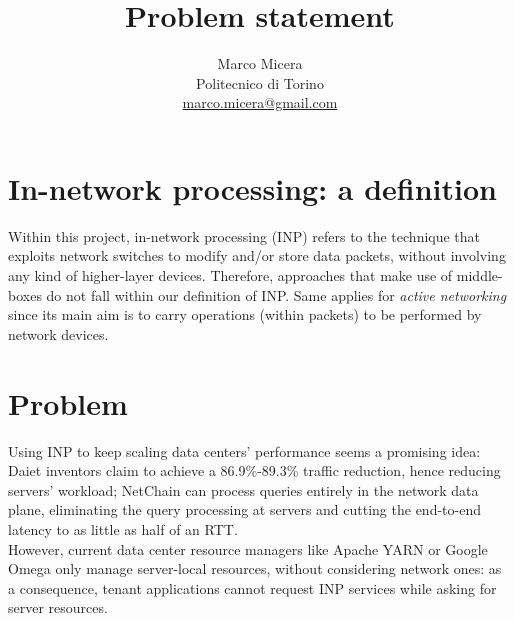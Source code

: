 \documentclass[letterpaper,twocolumn,10pt]{article}
\begin{document}
\title{Problem statement}

\date{}

\author{
{   \rm Marco Micera}\\
    Politecnico di Torino\\
    \href{mailto:marco.micera@gmail.com}{marco.micera@gmail.com}
}
\maketitle

\section{In-network processing: a definition}
Within this project, in-network processing (INP) refers to the technique that exploits network switches to modify and/or store data packets, without involving any kind of higher-layer devices. Therefore, approaches that make use of middle-boxes do not fall within our definition of INP. Same applies for \textit{active networking} since its main aim is to carry operations (within packets) to be performed by network devices.

\section{Problem}
Using INP to keep scaling data centers' performance seems a promising idea: Daiet \cite{daiet} inventors claim to achieve a 86.9\%-89.3\% traffic reduction, hence reducing servers' workload; NetChain \cite{netchain} can process queries entirely in the network data plane, eliminating the query processing at servers and cutting the end-to-end latency to as little as half of an RTT.\\
However, current data center resource managers like Apache YARN \cite{yarn} or Google Omega \cite{omega} only manage server-local resources, without considering network ones: as a consequence, tenant applications cannot request INP services while asking for server resources.
\end{document}
